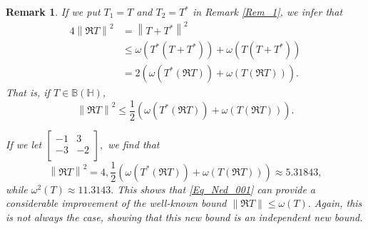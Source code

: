 \documentclass[12pt,twoside,reqno]{amsart}
\newtheorem{remark}{Remark}[section]
\numberwithin{equation}{section}
\begin{document}
\begin{remark}
If we put ${{T}_{1}}=T$ and ${{T}_{2}}={{T}^{*}}$ in Remark \ref{Rem_1}, we infer that
	\[\begin{aligned}
   4\left\| \Re T \right\|^2&={{\left\| T+{{T}^{*}} \right\|}^{2}} \\ 
 & \le \omega \left( {{T}^{*}}\left( T+{{T}^{*}} \right) \right)+\omega \left( T\left( T+{{T}^{*}} \right) \right) \\ 
 & =2\left( \omega \left( {{T}^{*}}\left( \Re T \right) \right)+\omega \left( T\left( \Re T \right) \right) \right). 
\end{aligned}\]
That is, if $T\in\mathbb{B}(\mathbb{H})$,
\begin{equation}\label{Eq_Ned_001}
\left\| \Re T \right\|^2\le \frac{1}{2}\left( \omega \left( {{T}^{*}}\left( \Re T \right) \right)+\omega \left( T\left( \Re T \right) \right) \right).
\end{equation}	
	
	If we let $\left[
\begin{array}{cc}
 -1 & 3 \\
 -3 & -2 \\
\end{array}
\right],$ we find that
\[\left\| \Re T \right\|^2=4, \frac{1}{2}\left( \omega \left( {{T}^{*}}\left( \Re T \right) \right)+\omega \left( T\left( \Re T \right) \right) \right)\approx 5.31843,\]
while $\omega^2(T)\approx 11.3143.$ This shows that \eqref{Eq_Ned_001} can provide a considerable improvement of the well-known bound $\|\Re T\|\leq\omega(T).$ Again, this is not always the case, showing that this new bound is an independent new bound.
\end{remark}
\end{document}
